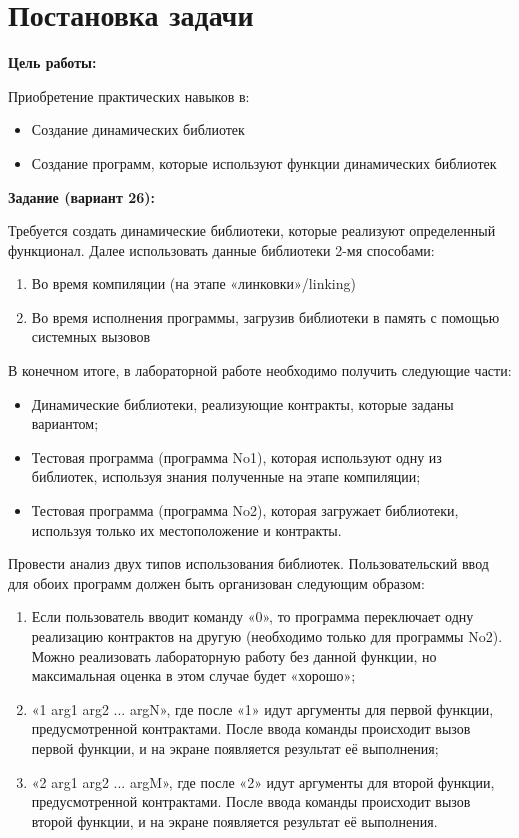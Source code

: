 \section{Постановка задачи}

{\bfseries Цель работы:} 

Приобретение практических навыков в:

\begin{itemize}
    \item Создание динамических библиотек
    \item Создание программ, которые используют функции динамических библиотек
\end{itemize}

{\bfseries Задание (вариант 26):} 

Требуется создать динамические библиотеки, которые реализуют определенный функционал. Далее использовать данные библиотеки 2-мя способами:

\begin{enumerate}
    \item Во время компиляции (на этапе «линковки»/linking)
    \item Во время исполнения программы, загрузив библиотеки в память с помощью системных вызовов
\end{enumerate}

В конечном итоге, в лабораторной работе необходимо получить следующие части:

\begin{itemize}
    \item Динамические библиотеки, реализующие контракты, которые заданы вариантом;
    \item Тестовая программа (программа No1), которая используют одну из библиотек, используя знания полученные на этапе компиляции;
    \item Тестовая программа (программа No2), которая загружает библиотеки, используя только их местоположение и контракты.
\end{itemize}

Провести анализ двух типов использования библиотек. Пользовательский ввод для обоих программ должен быть организован следующим образом:

\begin{enumerate}
    \item Если пользователь вводит команду «0», то программа переключает одну реализацию контрактов на другую (необходимо только для программы No2). Можно реализовать лабораторную работу без данной функции, но максимальная оценка в этом случае будет «хорошо»;
    \item «1 arg1 arg2 ... argN», где после «1» идут аргументы для первой функции, предусмотренной контрактами. После ввода команды происходит вызов первой функции, и на экране появляется результат её выполнения;
    \item «2 arg1 arg2 ... argM», где после «2» идут аргументы для второй функции, предусмотренной контрактами. После ввода команды происходит вызов второй функции, и на экране появляется результат её выполнения.
\end{enumerate}

